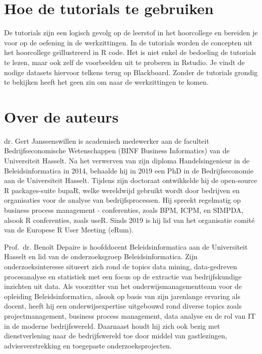 \documentclass[]{tufte-book}
\begin{document}
\hypertarget{hoe-de-tutorials-te-gebruiken}{%
\section*{Hoe de tutorials te gebruiken}\label{hoe-de-tutorials-te-gebruiken}}

De tutorials zijn een logisch gevolg op de leerstof in het hoorcollege en bereiden je voor op de oefening in de werkzittingen. In de tutorials worden de concepten uit het hoorcollege geïllustreerd in R code. Het is niet enkel de bedoeling de tutorials te lezen, maar ook zelf de voorbeelden uit te proberen in Rstudio. Je vindt de nodige datasets hiervoor telkens terug op Blackboard. Zonder de tutorials grondig te bekijken heeft het geen zin om naar de werkzittingen te komen.

\hypertarget{over-de-auteurs}{%
\section*{Over de auteurs}\label{over-de-auteurs}}

dr. Gert Janssenswillen is academisch medewerker aan de faculteit Bedrijfseconomische Wetenschappen (BINF Business Informatics) van de Universiteit Hasselt. Na het verwerven van zijn diploma Handelsingenieur in de Beleidsinformatica in 2014, behaalde hij in 2019 een PhD in de Bedrijfseconomie aan de Universiteit Hasselt. Tijdens zijn doctoraat ontwikkelde hij de open-source R packages-suite bupaR, welke wereldwijd gebruikt wordt door bedrijven en organisaties voor de analyse van bedrijfsprocessen. Hij spreekt regelmatig op business process management - conferenties, zoals BPM, ICPM, en SIMPDA, alsook R conferenties, zoals useR. Sinds 2019 is hij lid van het organisatie comité van de Europese R User Meeting (eRum).

Prof.~dr. Benoît Depaire is hoofddocent Beleidsinformatica aan de Universiteit Hasselt en lid van de onderzoeksgroep Beleidsinformatica. Zijn onderzoeksinteresse situeert zich rond de topics data mining, data-gedreven procesanalyse en statistiek met een focus op de extractie van bedrijfskundige inzichten uit data. Als voorzitter van het onderwijsmanagementteam voor de opleiding Beleidsinformatica, alsook op basis van zijn jarenlange ervaring als docent, heeft hij een onderwijsexpertise uitgebouwd rond diverse topics zoals projectmanagement, business process management, data analyse en de rol van IT in de moderne bedrijfswereld. Daarnaast houdt hij zich ook bezig met dienstverlening naar de bedrijfswereld toe door middel van gastlezingen, adviesverstrekking en toegepaste onderzoeksprojecten.
\end{document}
